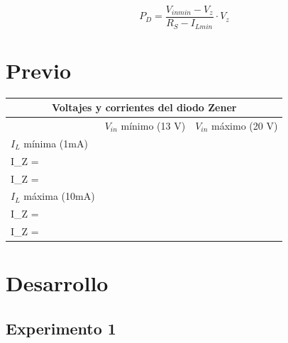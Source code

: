 \documentclass{mylib/reporteConCalif}
\begin{document}
$$P_D = \frac{V_{in min}- V_z}{R_S - I_{L min}} \cdot V_z$$

\newpage
\section{Previo}

\begin{center}
    \begin{tabular}{ | p{4cm} | p{4.5cm} |p{4.5cm} |}
    \hline
    \multicolumn{3}{|c|}{Voltajes y corrientes del diodo Zener} \\
  	\hline

	 & $V_{in}$ mínimo (13 V) & $V_{in}$ máximo (20 V) \\ \hline

	$I_L$ mínima (1mA) & \begin{flalign*} V_Z =  \\ I_Z = \end{flalign*} & \begin{flalign*} V_Z =  \\ I_Z = \end{flalign*} \\ \hline

	$I_L$ máxima (10mA) & \begin{flalign*} V_Z =  \\ I_Z = \end{flalign*} & \begin{flalign*} V_Z =  \\ I_Z = \end{flalign*}\\ \hline

    \end{tabular}
\end{center}





\newpage
\section{Desarrollo}

\subsection{Experimento 1}
\end{document}

